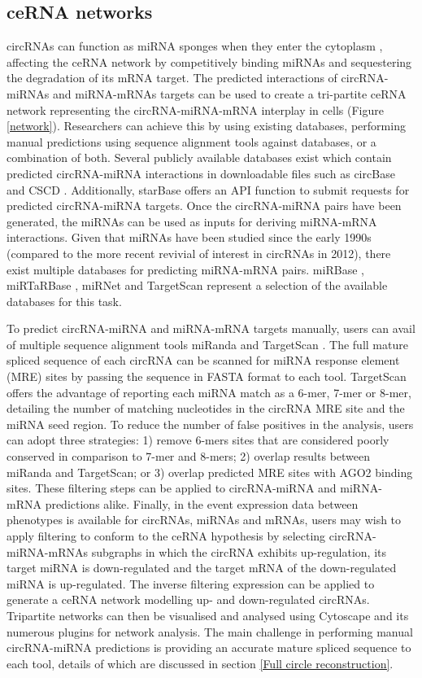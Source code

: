 \documentclass[pdflatex,sn-mathphys-num]{sn-jnl}
\begin{document}
\subsection*{ceRNA networks}
circRNAs can function as miRNA sponges when they enter the cytoplasm \cite{Hansen2013Mar, find_circ}, affecting the ceRNA network by competitively binding miRNAs and sequestering the degradation of its mRNA target. The predicted interactions of circRNA-miRNAs and miRNA-mRNAs targets can be used to create a tri-partite ceRNA network representing the circRNA-miRNA-mRNA interplay in cells (Figure \ref{network}). Researchers can achieve this by using existing databases, performing manual predictions using sequence alignment tools against databases, or a combination of both. Several publicly available databases exist which contain predicted circRNA-miRNA interactions in downloadable files such as circBase \cite{circbase} and CSCD \cite{CSCD}. Additionally, starBase \cite{starbase} offers an API function to submit requests for predicted circRNA-miRNA targets. Once the circRNA-miRNA pairs have been generated, the miRNAs can be used as inputs for deriving miRNA-mRNA interactions. Given that miRNAs have been studied since the early 1990s (compared to the more recent revivial of interest in circRNAs in 2012), there exist multiple databases for predicting miRNA-mRNA pairs. miRBase \cite{mirbase}, miRTaRBase \cite{mirtarbase}, miRNet \cite{mirnet} and TargetScan \cite{Targetscan} represent a selection of the available databases for this task. \par
To predict circRNA-miRNA and miRNA-mRNA targets manually, users can avail of multiple sequence alignment tools miRanda \cite{miranda} and TargetScan \cite{Targetscan}. The full mature spliced sequence of each circRNA can be scanned for miRNA response element (MRE) sites by passing the sequence in FASTA format to each tool. TargetScan offers the advantage of reporting each miRNA match as a 6-mer, 7-mer or 8-mer, detailing the number of matching nucleotides in the circRNA MRE site and the miRNA seed region. To reduce the number of false positives in the analysis, users can adopt three strategies: 1) remove 6-mers sites that are considered poorly conserved in comparison to 7-mer and 8-mers; 2) overlap results between miRanda and TargetScan; or 3) overlap predicted MRE sites with AGO2 binding sites. These filtering steps can be applied to circRNA-miRNA and miRNA-mRNA predictions alike. Finally, in the event expression data between phenotypes is available for circRNAs, miRNAs and mRNAs, users may wish to apply filtering to conform to the ceRNA hypothesis by selecting circRNA-miRNA-mRNAs subgraphs in which the circRNA exhibits up-regulation, its target miRNA is down-regulated and the target mRNA of the down-regulated miRNA is up-regulated. The inverse filtering expression can be applied to generate a ceRNA network modelling up- and down-regulated circRNAs. Tripartite networks can then be visualised and analysed using Cytoscape \cite{cytoscape} and its numerous plugins for network analysis. The main challenge in performing manual circRNA-miRNA predictions is providing an accurate mature spliced sequence to each tool, details of which are discussed in section \ref{Full circle reconstruction}.
\end{document}
